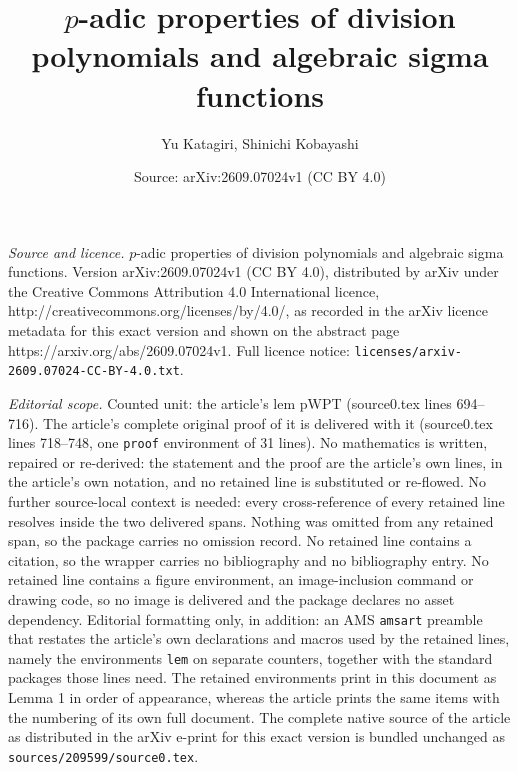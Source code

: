 \documentclass[10pt,a4paper]{amsart}
\title{$p$-adic properties of division polynomials and algebraic sigma functions}
\author{Yu Katagiri, Shinichi Kobayashi}
\date{Source: arXiv:2609.07024v1 (CC BY 4.0)}
\begin{document}
\maketitle

\noindent\emph{Source and licence.} $p$-adic properties of division polynomials and algebraic sigma functions. Version arXiv:2609.07024v1 (CC BY 4.0), distributed by arXiv under the Creative Commons Attribution 4.0 International licence, http://creativecommons.org/licenses/by/4.0/, as recorded in the arXiv licence metadata for this exact version and shown on the abstract page https://arxiv.org/abs/2609.07024v1. Full licence notice: \texttt{licenses/arxiv-2609.07024-CC-BY-4.0.txt}.\par\smallskip

\noindent\textit{Editorial scope.} Counted unit: the article's lem pWPT (source0.tex lines 694--716). The article's complete original proof of it is delivered with it (source0.tex lines 718--748, one \texttt{proof} environment of 31 lines). No mathematics is written, repaired or re-derived: the statement and the proof are the article's own lines, in the article's own notation, and no retained line is substituted or re-flowed.  No further source-local context is needed: every cross-reference of every retained line resolves inside the two delivered spans.  Nothing was omitted from any retained span, so the package carries no omission record.  No retained line contains a citation, so the wrapper carries no bibliography and no bibliography entry.  No retained line contains a figure environment, an image-inclusion command or drawing code, so no image is delivered and the package declares no asset dependency.  Editorial formatting only, in addition: an AMS \texttt{amsart} preamble that restates the article's own declarations and macros used by the retained lines, namely the environments \texttt{lem} on separate counters, together with the standard packages those lines need.  The retained environments print in this document as Lemma 1 in order of appearance, whereas the article prints the same items with the numbering of its own full document.  The complete native source of the article as distributed in the arXiv e-print for this exact version is bundled unchanged as \texttt{sources/209599/source0.tex}.
\end{document}
